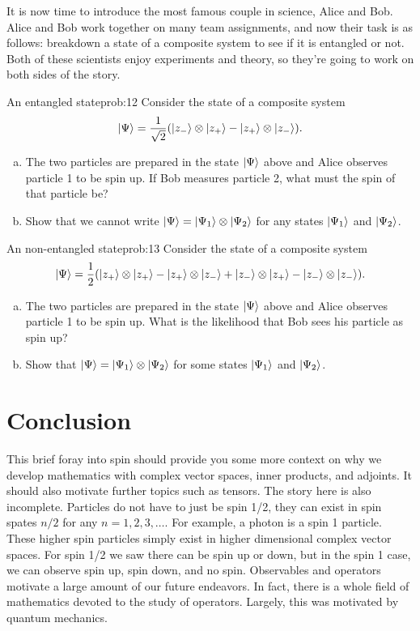 \documentclass{article}
\begin{document}
It is now time to introduce the most famous couple in science, Alice and Bob.  Alice and Bob work together on many team assignments, and now their task is as follows: breakdown a state of a composite system to see if it is entangled or not. Both of these scientists enjoy experiments and theory, so they're going to work on both sides of the story.

\begin{problem}{An entangled state}{prob:12}
Consider the state of a composite system
\[
\ket{\Psi} = \frac{1}{\sqrt{2}} ( \ket{z_-} \otimes \ket{z_+} - \ket{z_+} \otimes \ket{z_-}).
\]
\begin{enumerate}[(a)]
    \item The two particles are prepared in the state $\ket{\Psi}$ above and Alice observes particle 1 to be spin up. If Bob measures particle 2, what must the spin of that particle be?
    \item Show that we cannot write $\ket{\Psi}=\ket{\Psi_1}\otimes \ket{\Psi_2}$ for any states $\ket{\Psi_1}$ and $\ket{\Psi_2}$.
\end{enumerate}
\end{problem}

\begin{problem}{An non-entangled state}{prob:13}
Consider the state of a composite system
\[
\ket{\Psi} = \frac{1}{2} ( \ket{z_+} \otimes \ket{z_+} - \ket{z_+} \otimes \ket{z_-} + \ket{z_-}\otimes \ket{z_+}-\ket{z_-}\otimes \ket{z_-}).
\]
\begin{enumerate}[(a)]
    \item The two particles are prepared in the state $\ket{\Psi}$ above and Alice observes particle 1 to be spin up. What is the likelihood that Bob sees his particle as spin up?
    \item Show that $\ket{\Psi}=\ket{\Psi_1}\otimes \ket{\Psi_2}$ for some states $\ket{\Psi_1}$ and $\ket{\Psi_2}$.
\end{enumerate}
\end{problem}

\section{Conclusion}

    This brief foray into spin should provide you some more context on why we develop mathematics with complex vector spaces, inner products, and adjoints.  It should also motivate further topics such as tensors. The story here is also incomplete. Particles do not have to just be spin 1/2, they can exist in spin spates $n/2$ for any $n=1,2,3,\dots$.  For example, a photon is a spin 1 particle.  These higher spin particles simply exist in higher dimensional complex vector spaces. For spin 1/2 we saw there can be spin up or down, but in the spin 1 case, we can observe spin up, spin down, and no spin. Observables and operators motivate a large amount of our future endeavors. In fact, there is a whole field of mathematics devoted to the study of operators. Largely, this was motivated by quantum mechanics. 
\end{document}
